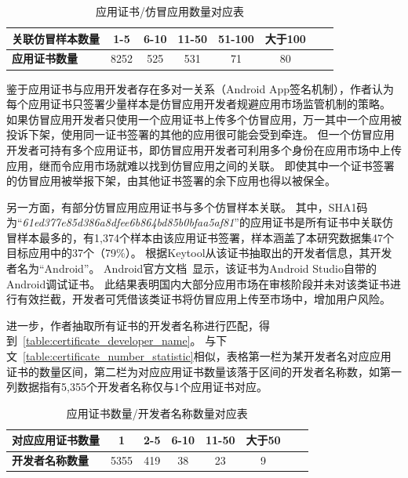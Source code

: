 \begin{table}[htbp]
    \renewcommand{\arraystretch}{1}
    \footnotesize
    \centering
    \caption{应用证书/仿冒应用数量对应表}
    \vspace{1mm}
    \begin{tabular}{l c c c c c c c}
        \toprule
        {\bf 关联仿冒样本数量} & {\bf 1-5} & {\bf 6-10} & {\bf 11-50} & {\bf 51-100} & {\bf 大于100} \\
        \midrule
        {\bf 应用证书数量}     & 8252      & 525        & 531         & 71           & 80            \\
        \bottomrule
    \end{tabular}
    \label{table:certificate_number_statistic}
\end{table}

鉴于应用证书与应用开发者存在多对一关系（Android App签名机制），作者认为每个应用证书只签署少量样本是仿冒应用开发者规避应用市场监管机制的策略。
如果仿冒应用开发者只使用一个应用证书上传多个仿冒应用，万一其中一个应用被投诉下架，使用同一证书签署的其他的应用很可能会受到牵连。
但一个仿冒应用开发者可持有多个应用证书，即仿冒应用开发者可利用多个身份在应用市场中上传应用，继而令应用市场就难以找到仿冒应用之间的关联。
即使其中一个证书签署的仿冒应用被举报下架，由其他证书签署的余下应用也得以被保全。

另一方面，有部分仿冒应用应用证书与多个仿冒样本关联。
其中，SHA1码为``\emph{61ed377e85d386a8dfee6b864bd85b0bfaa5af81}''的应用证书是所有证书中关联仿冒样本最多的，有1,374个样本由该应用证书签署，样本涵盖了本研究数据集47个目标应用中的37个（79\%）。
根据Keytool从该证书抽取出的开发者信息，其开发者名为``Android''。
Android官方文档~\cite{UICCcert}显示，该证书为Android Studio自带的Android调试证书。
此结果表明国内大部分应用市场在审核阶段并未对该类证书进行有效拦截，开发者可凭借该类证书将仿冒应用上传至市场中，增加用户风险。

进一步，作者抽取所有证书的开发者名称进行匹配，得到~\autoref{table:certificate_developer_name}。
与下文~\autoref{table:certificate_number_statistic}相似，表格第一栏为某开发者名对应应用证书的数量区间，第二栏为对应应用证书数量该落于区间的开发者名称数，如第一列数据指有5,355个开发者名称仅与1个应用证书对应。

\begin{table}[htbp]
    \renewcommand{\arraystretch}{1}
    \footnotesize
    \centering
    \caption{应用证书数量/开发者名称数量对应表}
    \vspace{1mm}
    \begin{tabular}{l c c c c c c c}
        \toprule
        {\bf 对应应用证书数量} & {\bf 1} & {\bf 2-5} & {\bf 6-10} & {\bf 11-50} & {\bf 大于50} \\
        \midrule
        {\bf 开发者名称数量}   & 5355    & 419       & 38         & 23          & 9            \\
        \bottomrule
    \end{tabular}
    \label{table:certificate_developer_name}
\end{table}


